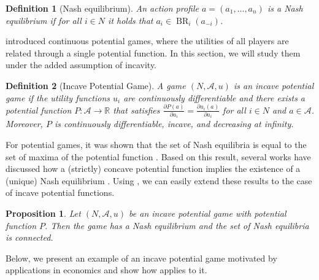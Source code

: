 \documentclass{article}
\newtheorem{definition}{Definition}[section]
\newtheorem{prop}{Proposition}
\newcommand{\R}{\mathbb{R}}
\DeclareMathOperator{\BR}{BR}
\begin{document}
\begin{definition}[Nash equilibrium]
An action profile $a=(a_1,\dots,a_n)$ is a \textit{Nash equilibrium} if for all $i\in N$ it holds that $a_i\in \BR_i(a_{-i})$.
\end{definition}

\citet{Monderer1996Potential} introduced continuous potential games, where the utilities of all players are related through a single potential function. In this section, we will study them under the added assumption of incavity.

\begin{definition}[Incave Potential Game]
        A game $(N,\mathcal{A},u)$ is an \emph{incave potential game} if the utility functions $u_i$ are continuously differentiable and there exists a \emph{potential function} $P:\mathcal{A}\to \R$ that satisfies $\frac{\partial P(a)}{\partial a_i} = \frac{\partial u_i(a)}{\partial a_i}$ for all $i\in N$ and $a\in \mathcal{A}$. Moreover, $P$ is continuously differentiable, incave, and decreasing at infinity.

\end{definition}

For potential games, it was shown that the set of Nash equilibria is equal to the set of maxima of the potential function \citep{Monderer1996Potential}. Based on this result, several works have discussed how a (strictly) concave potential function implies the existence of a (unique) Nash equilibrium \citep{Neyman1997Correlated,Mertikopoulos2018Learning}. Using , we can easily extend these results to the case of incave potential functions.

\begin{prop}
    \label{prop:incave_potential}
    Let $(N,\mathcal{A},u)$ be an incave potential game with potential function $P$. Then the game has a Nash equilibrium and the set of Nash equilibria is connected.
\end{prop}

Below, we present an example of an incave potential game motivated by applications in economics and show how  applies to it.
\end{document}
